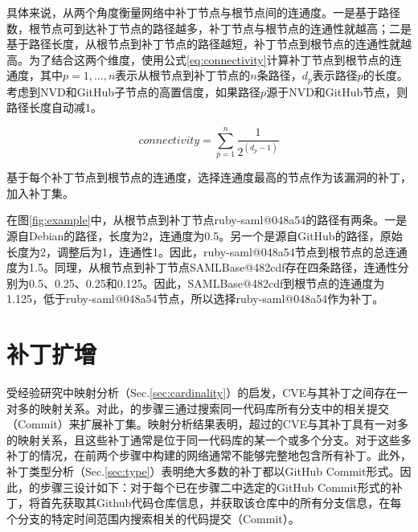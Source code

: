 具体来说，\tool 从两个角度衡量网络中补丁节点与根节点间的连通度。一是基于路径数，根节点可到达补丁节点的路径越多，补丁节点与根节点的连通性就越高；二是基于路径长度，从根节点到补丁节点的路径越短，补丁节点到根节点的连通性就越高。为了结合这两个维度，\tool 使用公式\ref{eq:connectivity}计算补丁节点到根节点的连通度，其中$ p = 1, ..., n$表示从根节点到补丁节点的$n$条路径，$d_p$表示路径$p$的长度。考虑到NVD和GitHub子节点的高置信度，如果路径$p$源于NVD和GitHub节点，则路径长度自动减1。

\begin{equation}\label{eq:connectivity}
    connectivity =\sum_{p=1}^{n}   \frac{1}{2^{({d}_{p} -1)}}
\end{equation}

基于每个补丁节点到根节点的连通度，\tool 选择连通度最高的节点作为该漏洞的补丁，加入补丁集。

\begin{exmp}
在图\ref{fig:example}中，从根节点到补丁节点ruby-saml@048a54的路径有两条。一是源自Debian的路径，长度为2，连通度为0.5。另一个是源自GitHub的路径，原始长度为2，调整后为1，连通性1。因此，ruby-saml@048a54节点到根节点的总连通度为1.5。同理，从根节点到补丁节点SAMLBase@482cdf存在四条路径，连通性分别为0.5、0.25、0.25和0.125。因此，SAMLBase@482cdf到根节点的连通度为1.125，低于ruby-saml@048a54节点，所以\tool 选择ruby-saml@048a54作为补丁。%
\end{exmp}


\section{补丁扩增}
受经验研究中映射分析（Sec.\ref{sec:cardinality}）的启发，CVE与其补丁之间存在一对多的映射关系。对此，\tool 的步骤三通过搜索同一代码库所有分支中的相关提交（Commit）来扩展补丁集。映射分析结果表明，超过的CVE与其补丁具有一对多的映射关系，且这些补丁通常是位于同一代码库的某一个或多个分支。对于这些多补丁的情况，\tool 在前两个步骤中构建的网络通常不能够完整地包含所有补丁。此外，补丁类型分析（Sec.\ref{sec:type}）表明绝大多数的补丁都以GitHub Commit形式。因此，\tool 的步骤三设计如下：对于每个已在步骤二中选定的GitHub Commit形式的补丁，\tool 将首先获取其Github代码仓库信息，并获取该仓库中的所有分支信息，在每个分支的特定时间范围内搜索相关的代码提交（Commit）。

